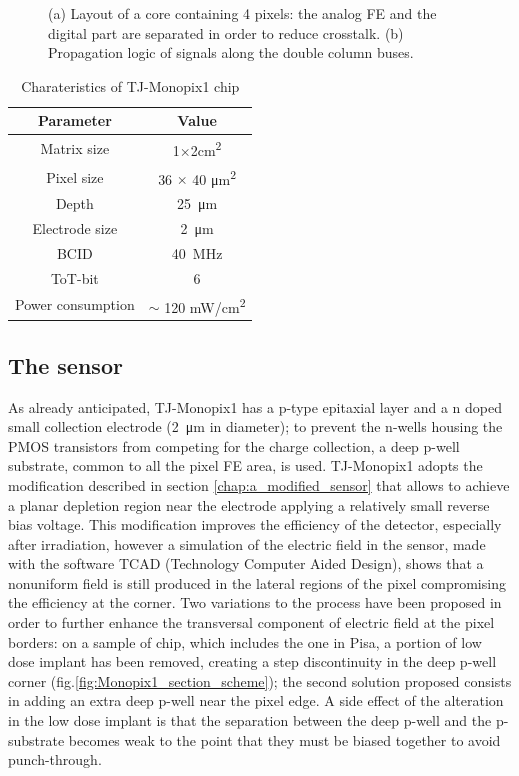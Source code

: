 \begin{figure}[h!]
\begin{subfigure}{.5\textwidth}
    \caption{}
    \label{fig:column_order_token}
    \end{subfigure}
    \caption{(a) Layout of a core containing 4 pixels: the analog FE and the digital part are separated in order to reduce crosstalk. (b) Propagation logic of signals along the double column buses.}
    \label{fig:column_order}
\end{figure}

\begin{table}
    \begin{center}
    \begin{tabular}{| c |c |}
    \hline
    Parameter & Value\\
    \hline
    \hline
    Matrix size &  1$\times$2\si{cm\squared}\\
    Pixel size & 36 $\times$ 40 \si{\um\squared}\\
    Depth & \SI{25}{\um}\\
    Electrode size & \SI{2}{\um}\\
    BCID & \SI{40}{MHz} \\
    ToT-bit & 6 \\
    Power consumption & $\sim$ 120 \si{mW/cm\squared}\\    
    \hline
    \end{tabular}
    \caption{Charateristics of TJ-Monopix1 chip}
    \label{tab:LF-TJ-Monopix}
    \end{center}
\end{table}


\subsection{The sensor}\label{chapter:TJMonopix1_thesensor}
    As already anticipated, TJ-Monopix1 has a p-type epitaxial layer and a n doped small collection electrode (\SI{2}{\um} in diameter); to prevent the n-wells housing the PMOS transistors from competing for the charge collection, a deep p-well substrate, common to all the pixel FE area, is used.
    TJ-Monopix1 adopts the modification described in section \ref{chap:a_modified_sensor} that allows to achieve a planar depletion region near the electrode applying a relatively small reverse bias voltage.
    This modification improves the efficiency of the detector, especially after irradiation, however a simulation of the electric field in the sensor, made with the software TCAD (Technology Computer Aided Design), shows that a nonuniform field is still produced in the lateral regions of the pixel compromising the efficiency at the corner.
    Two variations to the process have been proposed in order to further enhance the transversal component of electric field at the pixel borders: on a sample of chip, which includes the one in Pisa, a portion of low dose implant has been removed, creating a step discontinuity in the deep p-well corner (fig.\ref{fig:Monopix1_section_scheme}); the second solution proposed consists in adding an extra deep p-well near the pixel edge.
    A side effect of the alteration in the low dose implant is that the separation between the deep p-well and the p-substrate becomes weak to the point that they must be biased together to avoid punch-through.

